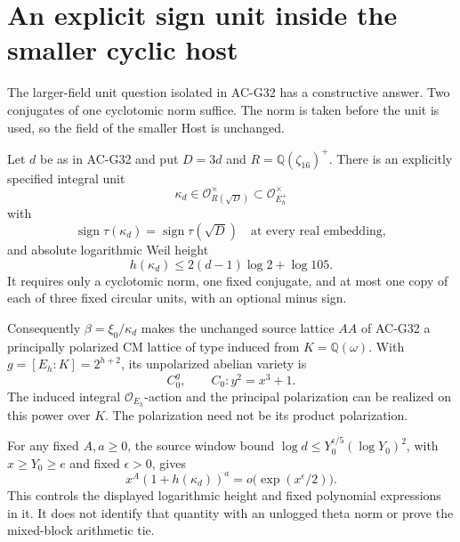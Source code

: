 \section{An explicit sign unit inside the smaller cyclic host}
\label{sec:cyclic-cm-unit}

The larger-field unit question isolated in AC-G32 has a
constructive answer.  Two conjugates of one cyclotomic norm
suffice.  The norm is taken before the unit is used, so the
field of the smaller Host is unchanged.

\begin{theorem}
\label{AC-G33}
Let $d$ be as in AC-G32 and put $D=3d$ and
$R=\mathbb Q(\zeta_{16})^+$.  There is an explicitly
specified integral unit
\[
 \kappa_d\in\mathcal O_{R(\sqrt D)}^\times
              \subset\mathcal O_{E_h^+}^\times
\]
with
\[
 \operatorname{sign}\tau(\kappa_d)
     =\operatorname{sign}\tau(\sqrt D)
                 \quad\text{at every real embedding},        \tag{G33.1}
\]
and absolute logarithmic Weil height
\[
             h(\kappa_d)\leq2(d-1)\log2+\log105.               \tag{G33.2}
\]
It requires only a cyclotomic norm, one fixed conjugate,
and at most one copy of each of three fixed circular units,
with an optional minus sign.

Consequently $\beta=\xi_0/\kappa_d$ makes the unchanged
source lattice $AA$ of AC-G32 a principally polarized
CM lattice of type induced from $K=\mathbb Q(\omega)$.
With $g=[E_h:K]=2^{h+2}$, its unpolarized abelian variety is
\[
                       C_0^g,\qquad C_0:y^2=x^3+1.             \tag{G33.3}
\]
The induced integral $\mathcal O_{E_h}$-action and the
principal polarization can be realized on this power over
$K$.  The polarization need not be its product polarization.

For any fixed $A,a\geq0$, the source window bound
$\log d\leq Y_0^{\epsilon/5}(\log Y_0)^2$, with
$x\geq Y_0\geq e$ and fixed $\epsilon>0$, gives
\[
        x^A(1+h(\kappa_d))^a
                    =o\bigl(\exp(x^\epsilon/2)\bigr).
                                                               \tag{G33.4}
\]
This controls the displayed logarithmic height and fixed
polynomial expressions in it.  It does not identify that
quantity with an unlogged theta norm or prove the mixed-block
arithmetic tie.
\end{theorem}
